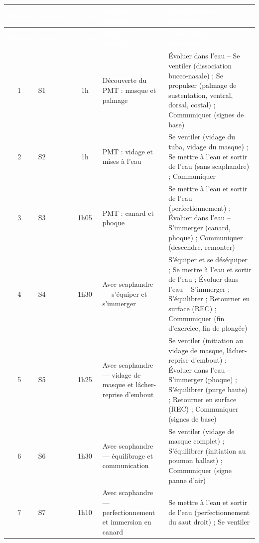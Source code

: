 \begin{longtable}{|c|p{2cm}|c|p{4.3cm}|p{5cm}|}
  \hline
  \rowcolor{ffessmblue}
  \textcolor{white}{\textbf{Séance}} & \textcolor{white}{\textbf{Semaine}} &
  \textcolor{white}{\textbf{Durée}} & \textcolor{white}{\textbf{Objectif principal}} &
  \textcolor{white}{\textbf{Compétences travaillées}} \\
  \hline
  \endfirsthead

  \hline
  \rowcolor{ffessmblue}
  \textcolor{white}{\textbf{Séance}} & \textcolor{white}{\textbf{Semaine}} &
  \textcolor{white}{\textbf{Durée}} & \textcolor{white}{\textbf{Objectif principal}} &
  \textcolor{white}{\textbf{Compétences travaillées}} \\
  \hline
  \endhead

  1 & S1 & 1h & Découverte du PMT : masque et palmage &
    Évoluer dans l'eau -- Se ventiler (dissociation bucco-nasale) ; Se propulser (palmage
    de sustentation, ventral, dorsal, costal) ; Communiquer (signes de base) \\ \hline
  2 & S2 & 1h & PMT : vidage et mises à l'eau &
    Se ventiler (vidage du tuba, vidage du masque) ; Se mettre à l'eau et sortir de l'eau
    (sans scaphandre) ; Communiquer \\ \hline
  3 & S3 & 1h05 & PMT : canard et phoque &
    Se mettre à l'eau et sortir de l'eau (perfectionnement) ; Évoluer dans l'eau --
    S'immerger (canard, phoque) ; Communiquer (descendre, remonter) \\ \hline
  4 & S4 & 1h30 & Avec scaphandre --- s'équiper et s'immerger &
    S'équiper et se déséquiper ; Se mettre à l'eau et sortir de l'eau ; Évoluer
    dans l'eau -- S'immerger ; S'équilibrer ; Retourner en surface (REC) ;
    Communiquer (fin d'exercice, fin de plongée) \\ \hline
  5 & S5 & 1h25 & Avec scaphandre --- vidage de masque et lâcher-reprise d'embout &
    Se ventiler (initiation au vidage de masque, lâcher-reprise d'embout) ; Évoluer dans
    l'eau -- S'immerger (phoque) ; S'équilibrer (purge haute) ; Retourner en surface
    (REC) ; Communiquer (signes de base) \\ \hline
  6 & S6 & 1h30 & Avec scaphandre --- équilibrage et communication &
    Se ventiler (vidage de masque complet) ; S'équilibrer (initiation au poumon ballast) ;
    Communiquer (signe panne d'air) \\ \hline
  7 & S7 & 1h10 & Avec scaphandre --- perfectionnement et immersion en canard &
    Se mettre à l'eau et sortir de l'eau (perfectionnement du saut droit) ; Se ventiler

\end{longtable}
